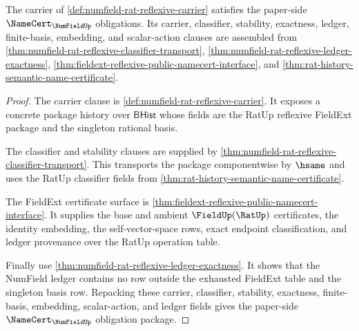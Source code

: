 \begin{theorem}
\label{thm:numfield-rat-reflexive-namecert-obligations}
The carrier of \autoref{def:numfield-rat-reflexive-carrier} satisfies the
paper-side $\NameCert_{\NumFieldUp}$ obligations. Its carrier, classifier,
stability, exactness, ledger, finite-basis, embedding, and scalar-action
clauses are assembled from
\autoref{thm:numfield-rat-reflexive-classifier-transport},
\autoref{thm:numfield-rat-reflexive-ledger-exactness},
\autoref{thm:fieldext-reflexive-public-namecert-interface}, and
\autoref{thm:rat-history-semantic-name-certificate}.
\end{theorem}
\begin{proof}
The carrier clause is
\autoref{def:numfield-rat-reflexive-carrier}. It exposes a concrete package
history over $\mathsf{BHist}$ whose fields are the RatUp reflexive FieldExt
package and the singleton rational basis.

The classifier and stability clauses are supplied by
\autoref{thm:numfield-rat-reflexive-classifier-transport}. This transports the
package componentwise by $\hsame$ and uses the RatUp classifier fields from
\autoref{thm:rat-history-semantic-name-certificate}.

The FieldExt certificate surface is
\autoref{thm:fieldext-reflexive-public-namecert-interface}. It supplies the
base and ambient $\FieldUp(\RatUp)$ certificates, the identity embedding, the
self-vector-space rows, exact endpoint classification, and ledger provenance
over the RatUp operation table.

Finally use
\autoref{thm:numfield-rat-reflexive-ledger-exactness}. It shows that the
NumField ledger contains no row outside the exhausted FieldExt table and the
singleton basis row. Repacking these carrier, classifier, stability,
exactness, finite-basis, embedding, scalar-action, and ledger fields gives the
paper-side $\NameCert_{\NumFieldUp}$ obligation package.
\end{proof}
